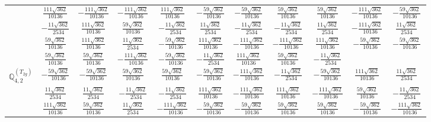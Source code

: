 \documentclass[fleqn,10pt,landscape]{article}
\begin{document}
\begin{itemize}
{\begin{center}
\begin{longtable}{ccccccccccc}
& $ \frac{111 \sqrt{362}}{10136} $ & $ - \frac{111 \sqrt{362}}{10136} $ & $ - \frac{111 \sqrt{362}}{10136} $ & $ \frac{111 \sqrt{362}}{10136} $ & $ - \frac{59 \sqrt{362}}{10136} $ & $ - \frac{59 \sqrt{362}}{10136} $ & $ \frac{59 \sqrt{362}}{10136} $ & $ \frac{59 \sqrt{362}}{10136} $ & $ - \frac{111 \sqrt{362}}{10136} $ & $ - \frac{59 \sqrt{362}}{10136} $ \\
& $ - \frac{11 \sqrt{362}}{2534} $ & $ \frac{111 \sqrt{362}}{10136} $ & $ \frac{59 \sqrt{362}}{10136} $ & $ - \frac{11 \sqrt{362}}{2534} $ & $ \frac{11 \sqrt{362}}{2534} $ & $ - \frac{11 \sqrt{362}}{2534} $ & $ - \frac{11 \sqrt{362}}{2534} $ & $ \frac{11 \sqrt{362}}{2534} $ & $ - \frac{111 \sqrt{362}}{10136} $ & $ \frac{11 \sqrt{362}}{2534} $ \\
& $ \frac{59 \sqrt{362}}{10136} $ & $ \frac{111 \sqrt{362}}{10136} $ & $ \frac{11 \sqrt{362}}{2534} $ & $ - \frac{59 \sqrt{362}}{10136} $ & $ \frac{111 \sqrt{362}}{10136} $ & $ - \frac{111 \sqrt{362}}{10136} $ & $ - \frac{111 \sqrt{362}}{10136} $ & $ \frac{111 \sqrt{362}}{10136} $ & $ - \frac{59 \sqrt{362}}{10136} $ & $ - \frac{59 \sqrt{362}}{10136} $ \\
& $ \frac{59 \sqrt{362}}{10136} $ & $ \frac{59 \sqrt{362}}{10136} $ & $ - \frac{111 \sqrt{362}}{10136} $ & $ - \frac{59 \sqrt{362}}{10136} $ & $ - \frac{11 \sqrt{362}}{2534} $ & $ \frac{111 \sqrt{362}}{10136} $ & $ \frac{59 \sqrt{362}}{10136} $ & $ - \frac{11 \sqrt{362}}{2534} $ & $  $ & $  $ \\ \hline
$\mathbb{Q}_{4,2}^{(T_{2g})}$ & $ - \frac{59 \sqrt{362}}{10136} $ & $ - \frac{59 \sqrt{362}}{10136} $ & $ \frac{59 \sqrt{362}}{10136} $ & $ \frac{59 \sqrt{362}}{10136} $ & $ - \frac{59 \sqrt{362}}{10136} $ & $ - \frac{111 \sqrt{362}}{10136} $ & $ - \frac{11 \sqrt{362}}{2534} $ & $ - \frac{59 \sqrt{362}}{10136} $ & $ \frac{111 \sqrt{362}}{10136} $ & $ \frac{11 \sqrt{362}}{2534} $ \\
& $ \frac{11 \sqrt{362}}{2534} $ & $ \frac{11 \sqrt{362}}{2534} $ & $ - \frac{11 \sqrt{362}}{2534} $ & $ - \frac{11 \sqrt{362}}{2534} $ & $ \frac{111 \sqrt{362}}{10136} $ & $ - \frac{111 \sqrt{362}}{10136} $ & $ \frac{111 \sqrt{362}}{10136} $ & $ - \frac{111 \sqrt{362}}{10136} $ & $ \frac{59 \sqrt{362}}{10136} $ & $ - \frac{11 \sqrt{362}}{2534} $ \\
& $ \frac{111 \sqrt{362}}{10136} $ & $ \frac{59 \sqrt{362}}{10136} $ & $ \frac{11 \sqrt{362}}{2534} $ & $ - \frac{111 \sqrt{362}}{10136} $ & $ - \frac{59 \sqrt{362}}{10136} $ & $ - \frac{59 \sqrt{362}}{10136} $ & $ \frac{59 \sqrt{362}}{10136} $ & $ \frac{59 \sqrt{362}}{10136} $ & $ - \frac{59 \sqrt{362}}{10136} $ & $ - \frac{111 \sqrt{362}}{10136} $ \\

\end{longtable}
\end{center}}
\end{itemize}
\end{document}

